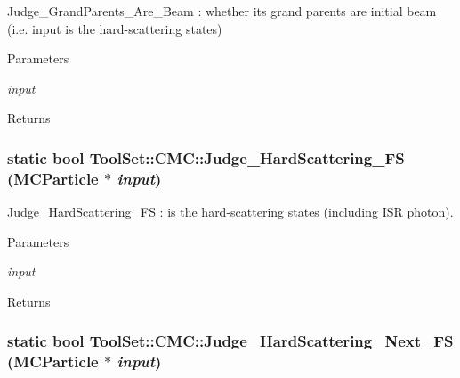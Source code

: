Judge\_\-GrandParents\_\-Are\_\-Beam : whether its grand parents are initial beam (i.e. input is the hard-\/scattering states)


\begin{DoxyParams}{Parameters}
\item[{\em input}]\end{DoxyParams}
\begin{DoxyReturn}{Returns}

\end{DoxyReturn}
\hypertarget{classToolSet_1_1CMC_a85fbb7bf0ef846c3ae1dcfeb27853911}{
\subsubsection[{Judge\_\-HardScattering\_\-FS}]{\setlength{\rightskip}{0pt plus 5cm}static bool ToolSet::CMC::Judge\_\-HardScattering\_\-FS (MCParticle $\ast$ {\em input})}}
\label{classToolSet_1_1CMC_a85fbb7bf0ef846c3ae1dcfeb27853911}


Judge\_\-HardScattering\_\-FS : is the hard-\/scattering states (including ISR photon). 
\begin{DoxyParams}{Parameters}
\item[{\em input}]\end{DoxyParams}
\begin{DoxyReturn}{Returns}

\end{DoxyReturn}
\hypertarget{classToolSet_1_1CMC_af28ed4c00c5b936aa0660253bd4af35b}{
\subsubsection[{Judge\_\-HardScattering\_\-Next\_\-FS}]{\setlength{\rightskip}{0pt plus 5cm}static bool ToolSet::CMC::Judge\_\-HardScattering\_\-Next\_\-FS (MCParticle $\ast$ {\em input})}}
\label{classToolSet_1_1CMC_af28ed4c00c5b936aa0660253bd4af35b}


